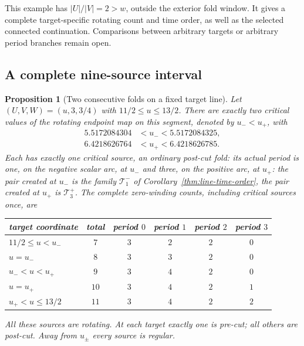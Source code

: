 \documentclass[11pt,a4paper]{article}
\newtheorem{proposition}[theorem]{Proposition}
\theoremstyle{remark}\newtheorem{remark}[theorem]{Remark}
\begin{document}
This example has $|U|/|V|=2>w$, outside the exterior fold window.
It gives a complete target-specific rotating count and time order, as
well as the selected connected continuation. Comparisons between
arbitrary targets or arbitrary period branches remain open.


\subsection{A complete nine-source interval}

\begin{proposition}[Two consecutive folds on a fixed target line]
\label{prop:nine-source-interval}
Let $(U,V,W)=(u,3,3/4)$ with $11/2\le u\le13/2$.
There are exactly two critical values of the rotating endpoint map on
this segment, denoted by $u_-<u_+$, with
\begin{equation}\label{eq:nine-source-boundaries}
 \begin{split}
 5.5172084304&<u_-<5.5172084325,\\
 6.4218626764&<u_+<6.4218626785.
 \end{split}
\end{equation}
Each has exactly one critical source, an ordinary post-cut fold:
its actual period is one, on the negative scalar arc, at $u_-$ and
three, on the positive arc, at $u_+$: the pair created at $u_-$ is the
family $\mathcal T_1^-$ of Corollary~\ref{thm:line-time-order}, the pair
created at $u_+$ is $\mathcal T_3^+$.
The complete zero-winding counts, including critical sources once, are
\begin{center}\small
\begin{tabular}{lccccc}
\toprule
target coordinate & total & period $0$ & period $1$ & period $2$ & period $3$\\
\midrule
$11/2\le u<u_-$ & $7$ & $3$ & $2$ & $2$ & $0$\\
$u=u_-$         & $8$ & $3$ & $3$ & $2$ & $0$\\
$u_-<u<u_+$     & $9$ & $3$ & $4$ & $2$ & $0$\\
$u=u_+$         & $10$ & $3$ & $4$ & $2$ & $1$\\
$u_+<u\le13/2$ & $11$ & $3$ & $4$ & $2$ & $2$\\
\bottomrule
\end{tabular}
\end{center}
All these sources are rotating. At each target exactly one is pre-cut;
all others are post-cut. Away from $u_\pm$ every source is regular.
\end{proposition}
\end{document}
